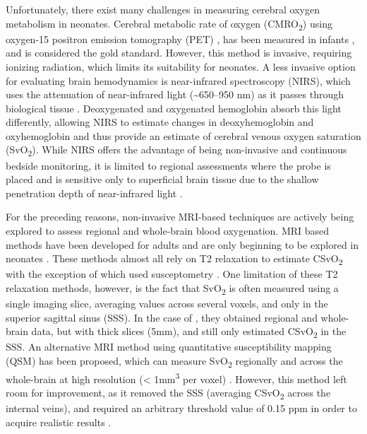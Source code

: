 \documentclass[
true
]{sn-jnl}
\begin{document}
Unfortunately, there exist many challenges in measuring cerebral oxygen
metabolism in neonates. Cerebral metabolic rate of oxygen
(CMRO\textsubscript{2}) using oxygen-15 positron emission tomography
(PET) \citep{mintunBrainOxygenUtilization1984}, has been measured in
infants \citep{altmanCerebralBloodFlow1988}, and is considered the gold
standard. However, this method is invasive, requiring ionizing
radiation, which limits its suitability for neonates. A less invasive
option for evaluating brain hemodynamics is near-infrared spectroscopy
(NIRS), which uses the attenuation of near-infrared light
(\textasciitilde650--950 nm) as it passes through biological tissue
\citep{skovEstimationCerebralVenous1993}. Deoxygenated and oxygenated
hemoglobin absorb this light differently, allowing NIRS to estimate
changes in deoxyhemoglobin and oxyhemoglobin
\citep{wrayCharacterizationInfraredAbsorption1988} and thus provide an
estimate of cerebral venous oxygen saturation (SvO\textsubscript{2}).
While NIRS offers the advantage of being non-invasive and continuous
bedside monitoring, it is limited to regional assessments where the
probe is placed and is sensitive only to superficial brain tissue due to
the shallow penetration depth of near-infrared light
\citep{boasDiffuseOpticalImaging2004}.

For the preceding reasons, non-invasive MRI-based techniques are
actively being explored to assess regional and whole-brain blood
oxygenation. MRI based methods have been developed for adults
\citep{jainRapidMagneticResonance2011, luQuantitativeEvaluationOxygenation2008, xuNoninvasiveQuantificationWholebrain2009}
and are only beginning to be explored in neonates
\citep{devisNoninvasiveMRIMeasurements2014, liuQuantitativeAssessmentGlobal2014, qiHemodynamicMetabolicAssessment2018, jainCerebralOxygenMetabolism2014, jiangVesselspecificQuantificationNeonatal2019}.
These methods almost all rely on T2 relaxation to estimate
CSvO\textsubscript{2}
\citep{devisNoninvasiveMRIMeasurements2014, liuQuantitativeAssessmentGlobal2014, qiHemodynamicMetabolicAssessment2018, jiangVesselspecificQuantificationNeonatal2019}
with the exception of \citet{jainCerebralOxygenMetabolism2014} which
used susceptometry \citep{jainMRIEstimationGlobal2010}. One limitation
of these T2 relaxation methods, however, is the fact that
SvO\textsubscript{2} is often measured using a single imaging slice,
averaging values across several voxels, and only in the superior
sagittal sinus (SSS). In the case of
\citet{jainCerebralOxygenMetabolism2014}, they obtained regional and
whole-brain data, but with thick slices (5mm), and still only estimated
CSvO\textsubscript{2} in the SSS. An alternative MRI method using
quantitative susceptibility mapping (QSM) has been proposed, which can
measure SvO\textsubscript{2} regionally and across the whole-brain at
high resolution (\textless{} 1mm\textsuperscript{3} per voxel)
\citep{weberQuantitativeSusceptibilityMapping2021}. However, this method
left room for improvement, as it removed the SSS (averaging
CSvO\textsubscript{2} across the internal veins), and required an
arbitrary threshold value of 0.15 ppm in order to acquire realistic
results \citep{weberQuantitativeSusceptibilityMapping2021}.
\end{document}
